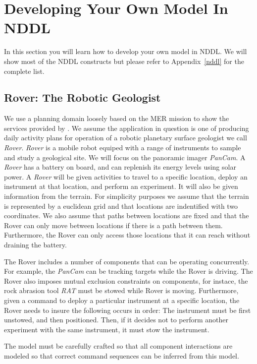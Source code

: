 \documentclass[10pt, letterpaper, twoside]{article}
\begin{document}
\section{Developing Your Own Model In NDDL}
\label{modeling}
In this section you will learn how to develop your own model in NDDL.  We
will show most of the NDDL constructs but please refer to
Appendix~\ref{nddl} for the complete list.

\subsection{Rover: The Robotic Geologist}

We use a planning domain loosely based on the MER mission to show the
services provided by \ET.  We assume the application in question is one of
producing daily activity plans for operation of a robotic planetary surface
geologist we call {\em Rover}. {\em Rover} is a mobile robot equiped with a
range of instruments to sample and study a geological site.  We will focus
on the panoramic imager {\em PanCam}. A {\em Rover} has a battery on board, and can
replenish its energy levels using solar power.  A {\em Rover} will be given
activities to travel to a specific location, deploy an instrument at that
location, and perform an experiment.  It will also be given information from
the terrain.  For simplicity purposes we assume that the terrain is
represented by a euclidean grid and that locations are indentified with two
coordinates.  We also assume that paths between locations are fixed and
that the Rover can only move between locations if there is a path
between them.  Furthermore, the Rover can only access those locations
that it can reach without draining the battery.

The Rover includes a number of components that can be operating
concurrently. For example, the {\em PanCam} can be tracking targets while
the Rover is driving. The Rover also imposes mutual exclusion constraints
on components, for instace, the rock abrasion tool {\em RAT}
must be stowed while Rover is moving. Furthermore, given a command to
deploy a particular instrument at a specific location, the Rover needs to
insure the following occurs in order: The instrument must be first
unstowed, and then positioned. Then, if it decides not to
perform another experiment with the same instrument, it must stow the
instrument. 

The model must be carefully crafted so that all component interactions are
modeled so that correct command sequences can be inferred from this model.
\end{document}

